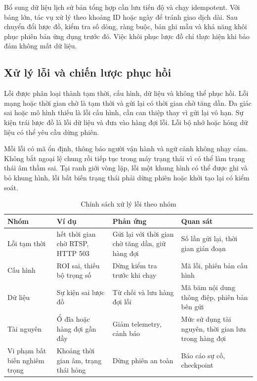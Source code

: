 Bổ sung dữ liệu lịch sử bản tổng hợp cần lưu tiến độ và chạy idempotent. Với bảng lớn, tác vụ xử lý theo khoảng ID hoặc ngày để tránh giao dịch dài. Sau chuyển đổi lược đồ, kiểm tra số dòng, ràng buộc, bản ghi mẫu và khả năng khôi phục phiên bản ứng dụng trước đó. Việc khôi phục lược đồ chỉ thực hiện khi bảo đảm không mất dữ liệu.

\subsection{Xử lý lỗi và chiến lược phục hồi}
Lỗi được phân loại thành tạm thời, cấu hình, dữ liệu và không thể phục hồi. Lỗi mạng hoặc thời gian chờ là tạm thời và gửi lại có thời gian chờ tăng dần. Đa giác sai hoặc mô hình thiếu là lỗi cấu hình, cần can thiệp thay vì gửi lại vô hạn. Sự kiện trái lược đồ là lỗi dữ liệu và đưa vào hàng đợi lỗi. Lỗi bộ nhớ hoặc hỏng dữ liệu có thể yêu cầu dừng phiên.

Mỗi lỗi có mã ổn định, thông báo người vận hành và ngữ cảnh không nhạy cảm. Không bắt ngoại lệ chung rồi tiếp tục trong máy trạng thái vì có thể làm trạng thái âm thầm sai. Tại ranh giới vòng lặp, lỗi một khung hình có thể được ghi và bỏ khung hình, lỗi bất biến trạng thái phải dừng phiên hoặc khởi tạo lại có kiểm soát.

\begin{table}[H]
\centering
\caption{Chính sách xử lý lỗi theo nhóm}
\label{tab:error-handling-implementation}
\begin{tabularx}{\textwidth}{p{3cm}p{3.3cm}X X}
\toprule
\textbf{Nhóm} & \textbf{Ví dụ} & \textbf{Phản ứng} & \textbf{Quan sát}\\
\midrule
Lỗi tạm thời & hết thời gian chờ RTSP, HTTP 503 & Gửi lại với thời gian chờ tăng dần, giữ hàng đợi & Số lần gửi lại, thời gian gián đoạn\\
Cấu hình & ROI sai, thiếu bộ trọng số & Dừng kiểm tra trước khi chạy & Mã lỗi, phiên bản cấu hình\\
Dữ liệu & Sự kiện sai lược đồ & Từ chối và lưu hàng đợi lỗi & Mã băm nội dung thông điệp, phiên bản bên gửi\\
Tài nguyên & Ổ đĩa hoặc hàng đợi gần đầy & Giảm telemetry, cảnh báo & Mức sử dụng tài nguyên, thời gian lưu trong hàng đợi\\
Vi phạm bất biến nghiêm trọng & Khoảng thời gian âm, trạng thái hỏng & Dừng phiên an toàn & Báo cáo sự cố, checkpoint\\
\bottomrule
\end{tabularx}
\end{table}

